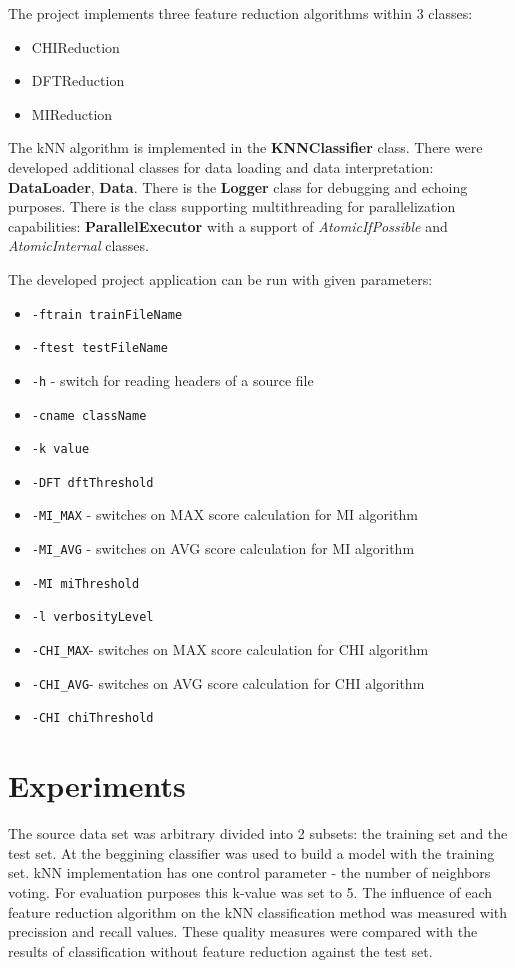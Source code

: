 \documentclass[12pt,a4paper]{report}
\begin{document}
The project implements three feature reduction algorithms within 3 classes:
\begin{itemize}
  \item CHIReduction
  \item DFTReduction
  \item MIReduction
\end{itemize}
The kNN algorithm is implemented in the \textbf{KNNClassifier} class. There were developed additional classes for data loading and data interpretation: \textbf{DataLoader}, \textbf{Data}. There is the \textbf{Logger} class for debugging and echoing purposes. There is the class supporting multithreading  for parallelization capabilities: \textbf{ParallelExecutor} with a support of \emph{AtomicIfPossible} and \emph{AtomicInternal} classes.

The developed project application can be run with given parameters:
\begin{itemize}
  \item \texttt{-ftrain trainFileName}
  \item \texttt{-ftest testFileName}
  \item \texttt{-h} - switch for reading headers of a source file
  \item \texttt{-cname className}
  \item \texttt{-k value}
  \item \texttt{-DFT dftThreshold}
  \item \texttt{-MI\_MAX} - switches on MAX score calculation for MI algorithm
  \item \texttt{-MI\_AVG} - switches on AVG score calculation for MI algorithm
  \item \texttt{-MI miThreshold}
  \item \texttt{-l verbosityLevel}
  \item \texttt{-CHI\_MAX}- switches on MAX score calculation for CHI algorithm
  \item \texttt{-CHI\_AVG}- switches on AVG score calculation for CHI algorithm
  \item \texttt{-CHI chiThreshold}
\end{itemize}

\chapter{Experiments}
The source data set was arbitrary divided into 2 subsets: the training set and the test set. At the beggining classifier was used to build a model with the training set. kNN implementation has one control parameter - the number of neighbors voting. For evaluation purposes this k-value was set to 5.
The influence of each feature reduction algorithm on the kNN classification method was measured with precission and recall values. These quality measures were compared with the results of classification without feature reduction against the test set.
\end{document}

